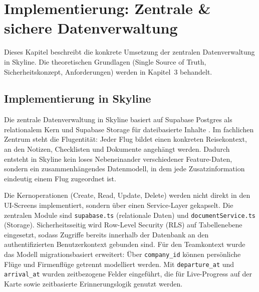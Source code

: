 

\chapter{Implementierung: Zentrale \& sichere Datenverwaltung}\label{chapter:datenverwaltung}

Dieses Kapitel beschreibt die konkrete Umsetzung der zentralen Datenverwaltung in Skyline.
Die theoretischen Grundlagen (Single Source of Truth, Sicherheitskonzept, Anforderungen)
werden in Kapitel~3 behandelt.

\section{Implementierung in Skyline}

Die zentrale Datenverwaltung in Skyline basiert auf Supabase Postgres als relationalem Kern
und Supabase Storage für dateibasierte Inhalte \cite{supabaseStorage}.
Im fachlichen Zentrum steht die Flugentität: Jeder Flug bildet einen konkreten Reisekontext,
an den Notizen, Checklisten und Dokumente angehängt werden.
Dadurch entsteht in Skyline kein loses Nebeneinander verschiedener Feature-Daten, sondern ein
zusammenhängendes Datenmodell, in dem jede Zusatzinformation eindeutig einem Flug zugeordnet ist.

Die Kernoperationen (Create, Read, Update, Delete) werden nicht direkt in den UI-Screens
implementiert, sondern über einen Service-Layer gekapselt. Die zentralen Module sind
\texttt{supabase.ts} (relationale Daten) und \texttt{documentService.ts} (Storage).
Sicherheitsseitig wird Row-Level Security (RLS) auf Tabellenebene eingesetzt, sodass
Zugriffe bereits innerhalb der Datenbank an den authentifizierten Benutzerkontext gebunden sind.
Für den Teamkontext wurde das Modell migrationsbasiert erweitert: Über \texttt{company\_id}
können persönliche Flüge und Firmenflüge getrennt modelliert werden.
Mit \texttt{departure\_at} und \texttt{arrival\_at} wurden zeitbezogene Felder eingeführt,
die für Live-Progress auf der Karte sowie zeitbasierte Erinnerungslogik genutzt werden.

